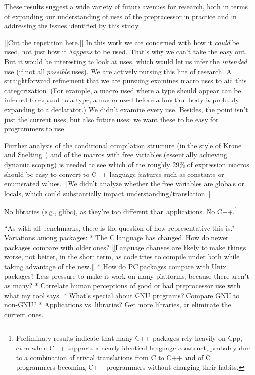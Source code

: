 \documentclass[10pt]{article}
\newcommand{\pkg}[1]{\textsf{#1}}
\begin{document}
These results suggest a wide variety of future avenues for research, both
in terms of expanding our understanding of uses of the preprocessor in
practice and in addressing the issues identified by this study.

[[Cut the repetition here.]]
In this work  we are concerned with how it {\em could} be used, not just how it {\em
  happens} to be used.  That's why we can't take the easy out.  But it
  would be interesting to look at uses, which would let us infer the {\em
  intended} use (if not all {\em possible} uses).  We are actively pursing
  this line of research.
A straightforward refinement that we are pursuing examines macro uses to
aid this categorization.  (For example, a macro used where a type should
appear can be inferred to expand to a type; a macro used before a function
body is probably expanding to a declarator.)
        We didn't examine every use.  Besides, the point isn't just the
          current uses, but also future uses:  we want these to be easy for
          programmers to use.

Further analysis of the conditional
compilation structure (in the style of Krone and Snelting~\cite{Krone94})
and of the macros with free variables (essentially achieving dynamic
scoping) is needed to see which of the roughly 29\% of expression macros
should be easy to convert to C++ language features such as constants or
enumerated values.
  [[We didn't analyze whether the free variables are globals or locals,
          which could substantially impact understanding/translation.]]


No libraries (e.g., \pkg{glibc}), as they're too different than applications.
No C++.\footnote{Preliminary results indicate that many
  C++ packages rely heavily on Cpp, even when C++ supports a nearly
  identical language construct, probably due to a combination of trivial
  translations from C to C++ and of C programmers becoming C++ programmers
  without changing their habits.}

``As with all benchmarks, there is the question of how representative this is.''
Variations among packages:
 * The C language has changed.  How do newer packages compare with older ones?
   [[Language changes are likely to make things worse, not better, in the
   short term, as code tries to compile under both while taking advantage
   of the new.]]
 * How do PC packages compare with Unix packages?  Less pressure to make it
   work on many platforms, because there aren't as many?
 * Correlate human perceptions of good or bad preprocessor use with what my
   tool says.
 * What's special about GNU programs?  Compare GNU to non-GNU?
 * Applications vs. libraries?  Get more libraries, or eliminate the current
   ones.
\end{document}
